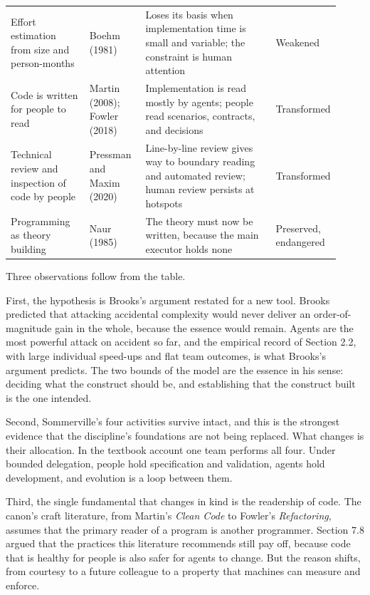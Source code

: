 \documentclass[11pt]{article}
\begin{document}
\begin{longtable}{p{0.24\linewidth}p{0.17\linewidth}p{0.4\linewidth}p{0.11\linewidth}}
Effort estimation from size and person-months & Boehm (1981) & Loses its basis when implementation time is small and variable; the constraint is human attention & Weakened \\
Code is written for people to read & Martin (2008); Fowler (2018) & Implementation is read mostly by agents; people read scenarios, contracts, and decisions & Transformed \\
Technical review and inspection of code by people & Pressman and Maxim (2020) & Line-by-line review gives way to boundary reading and automated review; human review persists at hotspots & Transformed \\
Programming as theory building & Naur (1985) & The theory must now be written, because the main executor holds none & Preserved, endangered \\
\bottomrule
\end{longtable}
\normalsize

Three observations follow from the table.

First, the hypothesis is Brooks's argument restated for a new tool. Brooks predicted that attacking accidental complexity would never deliver an order-of-magnitude gain in the whole, because the essence would remain. Agents are the most powerful attack on accident so far, and the empirical record of Section 2.2, with large individual speed-ups and flat team outcomes, is what Brooks's argument predicts. The two bounds of the model are the essence in his sense: deciding what the construct should be, and establishing that the construct built is the one intended.

Second, Sommerville's four activities survive intact, and this is the strongest evidence that the discipline's foundations are not being replaced. What changes is their allocation. In the textbook account one team performs all four. Under bounded delegation, people hold specification and validation, agents hold development, and evolution is a loop between them.

Third, the single fundamental that changes in kind is the readership of code. The canon's craft literature, from Martin's \emph{Clean Code} to Fowler's \emph{Refactoring}, assumes that the primary reader of a program is another programmer. Section 7.8 argued that the practices this literature recommends still pay off, because code that is healthy for people is also safer for agents to change. But the reason shifts, from courtesy to a future colleague to a property that machines can measure and enforce.
\end{document}
